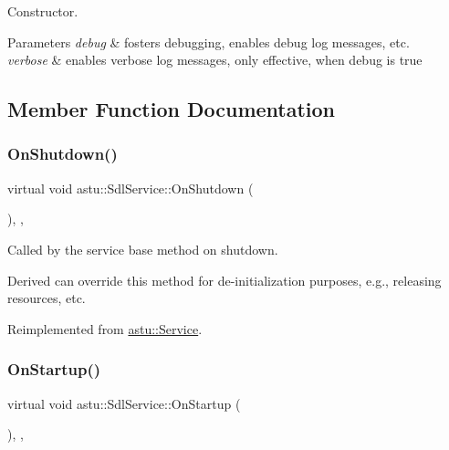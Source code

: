 Constructor.


\begin{DoxyParams}{Parameters}
{\em debug} & fosters debugging, enables debug log messages, etc. \\
\hline
{\em verbose} & enables verbose log messages, only effective, when debug is true \\
\hline
\end{DoxyParams}


\subsection{Member Function Documentation}
\mbox{\label{classastu_1_1SdlService_a20d53237efd1c717d773a8ff121b093b}} 
\subsubsection{\texorpdfstring{On\+Shutdown()}{OnShutdown()}}
{\footnotesize\ttfamily virtual void astu\+::\+Sdl\+Service\+::\+On\+Shutdown (\begin{DoxyParamCaption}{ }\end{DoxyParamCaption})\hspace{0.3cm}{\ttfamily [override]}, {\ttfamily [protected]}, {\ttfamily [virtual]}}

Called by the service base method on shutdown.

Derived can override this method for de-\/initialization purposes, e.\+g., releasing resources, etc. 

Reimplemented from \hyperlink{classastu_1_1Service_a1e1dff727df791c57fae782d8a613c5f}{astu\+::\+Service}.

\mbox{\label{classastu_1_1SdlService_a2fcb46537de794ab6e4f5e043b26ff60}} 
\subsubsection{\texorpdfstring{On\+Startup()}{OnStartup()}}
{\footnotesize\ttfamily virtual void astu\+::\+Sdl\+Service\+::\+On\+Startup (\begin{DoxyParamCaption}{ }\end{DoxyParamCaption})\hspace{0.3cm}{\ttfamily [override]}, {\ttfamily [protected]}, {\ttfamily [virtual]}}

